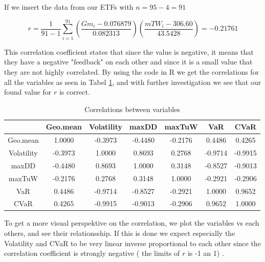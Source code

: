 \documentclass{article}
\begin{document}
If we insert the data from our ETFs with $n = 95-4=91$ 

\begin{equation}\label{covariance_w.data}
r=\frac{1}{91-1}\sum_{i=1}^{91}\left(\frac{Gm_i-0.076879}{0.082313}\right)\left(\frac{mTW_i-306.60}{43.5428}\right)=-0.21761
\end{equation}

This correlation coefficient states that since the value is negative, it means that they have a negative "feedback" on each other and since it is a small value that they are not highly correlated. By using the code in R we get the correlations for all the variables as seen in Tabel \ref{correlations}, and with further investigation we see that our found value for $r$ is correct.

\begin{table}[h!]
\centering
\caption{Correlations between variables} \vspace{1mm}
\label{correlations}
\begin{tabular}{|c||c|c|c|c|c|c|}
\hline
           & Geo.mean   & Volatility & maxDD      & maxTuW     & VaR        & CVaR       \\ \hline \hline
Geo.mean   & 1.0000  & -0.3973 & -0.4480 & -0.2176 & 0.4486  & 0.4265  \\ \hline
Volatility & -0.3973 & 1.0000  & 0.8693  & 0.2768  & -0.9714 & -0.9915 \\ \hline
maxDD      & -0.4480 & 0.8693  & 1.0000  & 0.3148  & -0.8527 & -0.9013 \\ \hline
maxTuW     & -0.2176 & 0.2768  & 0.3148  & 1.0000  & -0.2921 & -0.2906 \\ \hline
VaR        & 0.4486  & -0.9714 & -0.8527 & -0.2921 & 1.0000  & 0.9652  \\ \hline
CVaR       & 0.4265  & -0.9915 & -0.9013 & -0.2906 & 0.9652  & 1.0000  \\ \hline
\end{tabular}
\end{table}

To get a more visual perspektive on the correlation, we plot the variables vs each others, and see their relationsship. If this is done we expect especially the Volatility and CVaR to be very linear inverse proportional to each other since the correlation coefficient is strongly negative ( the limits of $r$ is -1 an 1) .\\
\end{document}
